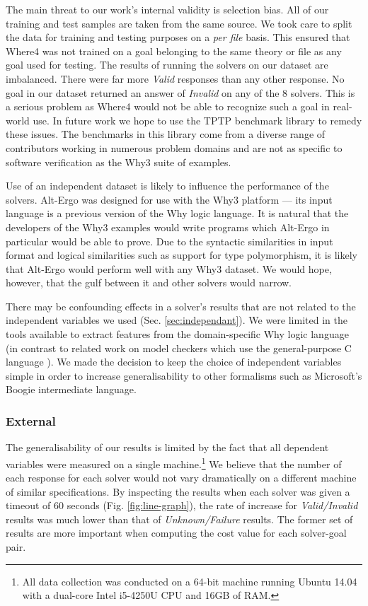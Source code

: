 \documentclass[submission,copyright,creativecommons]{eptcs}
\begin{document}
The main threat to our work's internal validity is selection bias. All of our training and test samples are taken from the same source. We took care to split the data for training and testing purposes on a \textit{per file} basis. This ensured that \textsf{Where4} was not trained on a goal belonging to the same theory or file as any goal used for testing. 
The results of running the solvers on our dataset are imbalanced. There were far more \textit{Valid} responses than any other response. No goal in our dataset returned an answer of \textit{Invalid} on any of the 8 solvers. This is a serious problem as \textsf{Where4} would not be able to recognize such a goal in real-world use. In future work we hope to use the TPTP benchmark library to remedy these issues. The benchmarks in this library come from a diverse range of contributors working in numerous problem domains \cite{Sutcliffe200139} and are not as specific to software verification as the \textsf{Why3} suite of examples.

Use of an independent dataset is likely to influence the performance of the solvers. Alt-Ergo was designed for use with the \textsf{Why3} platform --- its input language is a previous version of the Why logic language. It is natural that the developers of the \textsf{Why3} examples would write programs which Alt-Ergo in particular would be able to prove. Due to the syntactic similarities in input format and logical similarities such as support for type polymorphism, it is likely that Alt-Ergo would perform well with any \textsf{Why3} dataset. We would hope, however, that the gulf between it and other solvers would narrow.

There may be confounding effects in a solver's results that are not related to the independent variables we used (Sec. \ref{sec:independant}). We were limited in the tools available to extract features from the domain-specific Why logic language (in contrast to related work on model checkers which use the general-purpose C language \cite{DPVZ15:CAV}\cite{MUX}). We made the decision to keep the choice of independent variables simple in order to increase generalisability to other formalisms such as Microsoft's Boogie \cite{Boogie} intermediate language.  

\subsubsection{External}

The generalisability of our results is limited by the fact that all dependent variables were measured on a single machine.\footnote{All data collection was conducted on a 64-bit machine running Ubuntu 14.04 with a dual-core Intel i5-4250U CPU and 16GB of RAM.} We believe that the number of each response for each solver would not vary dramatically on a different machine of similar specifications. By inspecting the results when each solver was given a timeout of 60 seconds (Fig. \ref{fig:line-graph}), the rate of increase for \textit{Valid/Invalid} results was much lower than that of \textit{Unknown/Failure} results. The former set of results are more important when computing the cost value for each solver-goal pair.
\end{document}
